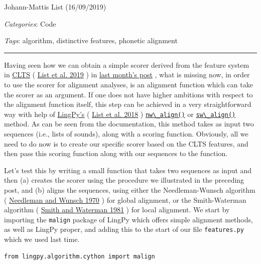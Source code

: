 \documentclass[
  a4paper,
  14pt,
  oneside,
  tablecaptionabove
]{scrbook}
\newcommand{\passthrough}[1]{#1}
\begin{document}
Johann-Mattis List (16/09/2019)

\emph{Categories}: Code

\emph{Tags}: algorithm, distinctive features, phonetic alignment

\begin{center}\rule{0.5\linewidth}{1pt}\end{center}

Having seen how we can obtain a simple scorer derived from the feature
system in \href{https://clts.clld.org}{CLTS} (
\href{http://bibliography.lingpy.org?key=CLTS}{List et al. 2019} ) in
\href{https://calc.hypotheses.org/1962}{last month's post} , what is
missing now, in order to use the scorer for alignment analyses, is an
alignment function which can take the scorer as an argument. If one does
not have higher ambitions with respect to the alignment function itself,
this step can be achieved in a very straightforward way with help of
\href{http://lingpy.org}{LingPy's} (
\href{http://bibliography.lingpy.org?key=LingPy}{List et al. 2018} )
\href{http://lingpy.org/reference/lingpy.algorithm.cython.html\#lingpy.algorithm.cython.malign.nw_align}{\passthrough{\lstinline!nw\_align()!}}
or
\href{http://lingpy.org/reference/lingpy.algorithm.cython.html\#lingpy.algorithm.cython.malign.sw_align}{\passthrough{\lstinline!sw\_align()!}}
method. As can be seen from the documentation, this method takes as
input two sequences (i.e., lists of sounds), along with a scoring
function. Obviously, all we need to do now is to create our specific
scorer based on the CLTS features, and then pass this scoring function
along with our sequences to the function.

Let's test this by writing a small function that takes two sequences as
input and then (a) creates the scorer using the procedure we illustrated
in the preceding post, and (b) aligns the sequences, using either the
Needleman-Wunsch algorithm (
\href{http://bibliography.lingpy.org?key=Needleman1970}{Needleman and
Wunsch 1970} ) for global alignment, or the Smith-Waterman algorithm (
\href{http://bibliography.lingpy.org?key=Smith1981}{Smith and Waterman
1981} ) for local alignment. We start by importing the
\passthrough{\lstinline!malign!} package of LingPy which offers simple
alignment methods, as well as LingPy proper, and adding this to the
start of our file \passthrough{\lstinline!features.py!} which we used
last time.

\begin{lstlisting}
from lingpy.algorithm.cython import malign
\end{lstlisting}
\end{document}
